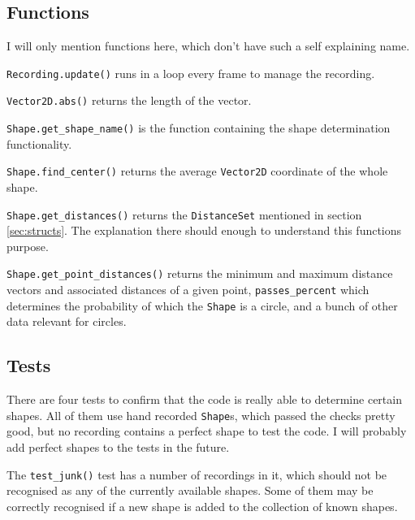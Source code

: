 \documentclass[12pt, a4paper]{article}
\begin{document}
        \subsection{Functions}
            I will only mention functions here, which don't have such a self explaining name.\hfill\break

            \texttt{Recording.update()} runs in a loop every frame to manage the recording.\hfill\break

            \texttt{Vector2D.abs()} returns the length of the vector.\hfill\break

            \texttt{Shape.get\_shape\_name()} is the function containing the shape determination functionality.\hfill\break

            \texttt{Shape.find\_center()} returns the average \texttt{Vector2D} coordinate of the whole shape.\hfill\break

            \texttt{Shape.get\_distances()} returns the \texttt{DistanceSet} mentioned in section \ref{sec:structs}. The explanation there should enough to understand this functions purpose.\hfill\break

            \texttt{Shape.get\_point\_distances()} returns the minimum and maximum distance vectors and associated distances of a given point, \texttt{passes\_percent} which determines the probability of which the \texttt{Shape} is a circle, and a bunch of other data relevant for circles.

        \subsection{Tests}
            There are four tests to confirm that the code is really able to determine certain shapes. All of them use hand recorded \texttt{Shape}s, which passed the checks pretty good, but no recording contains a perfect shape to test the code. I will probably add perfect shapes to the tests in the future.

            The \texttt{test\_junk()} test has a number of recordings in it, which should not be recognised as any of the currently available shapes. Some of them may be correctly recognised if a new shape is added to the collection of known shapes.
\end{document}
